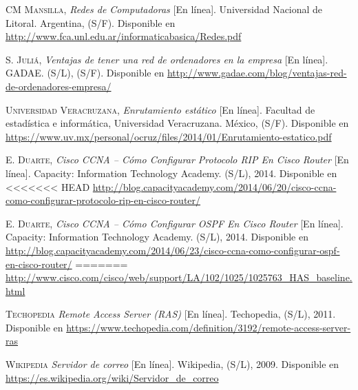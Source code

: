 
\begin{thebibliography}{X}

		\textsc{CM Mansilla,}
		\textit{Redes de Computadoras} [En línea].
		Universidad Nacional de Litoral. Argentina, (S/F). 
		\newline
		Disponible en 
		\url{http://www.fca.unl.edu.ar/informaticabasica/Redes.pdf}

		\textsc{S. Juliá,}
		\textit{Ventajas de tener una red de ordenadores en la empresa} [En línea].
		GADAE. (S/L), (S/F). 
		\newline
		Disponible en 
		\url{http://www.gadae.com/blog/ventajas-red-de-ordenadores-empresa/}

		\textsc{Universidad Veracruzana,}
		\textit{Enrutamiento estático} [En línea].
		Facultad de estadística e informática, Universidad Veracruzana. México, (S/F). 
		\newline
		Disponible en 
		\url{https://www.uv.mx/personal/ocruz/files/2014/01/Enrutamiento-estatico.pdf}

		\textsc{E. Duarte,}
		\textit{Cisco CCNA – Cómo Configurar Protocolo RIP En Cisco Router} [En línea].
		Capacity: Information Technology Academy. (S/L), 2014. 
		\newline
		Disponible en 
<<<<<<< HEAD
		\url{http://blog.capacityacademy.com/2014/06/20/cisco-ccna-como-configurar-protocolo-rip-en-cisco-router/}
		
		\textsc{E. Duarte,}
		\textit{Cisco CCNA – Cómo Configurar OSPF En Cisco Router} [En línea].
		Capacity: Information Technology Academy. (S/L), 2014. 
		\newline
		Disponible en 
		\url{http://blog.capacityacademy.com/2014/06/23/cisco-ccna-como-configurar-ospf-en-cisco-router/}
=======
		\url{http://www.cisco.com/cisco/web/support/LA/102/1025/1025763_HAS_baseline.html}

		\textsc{Techopedia}
		\textit{Remote Access Server (RAS)} [En línea].
		Techopedia, (S/L), 2011.
		\newline
		Disponible en
		\url{https://www.techopedia.com/definition/3192/remote-access-server-ras}

		\textsc{Wikipedia}
		\textit{Servidor de correo} [En línea].
		Wikipedia, (S/L), 2009.
		\newline
		Disponible en
		\url{https://es.wikipedia.org/wiki/Servidor_de_correo}
		

\end{thebibliography}
